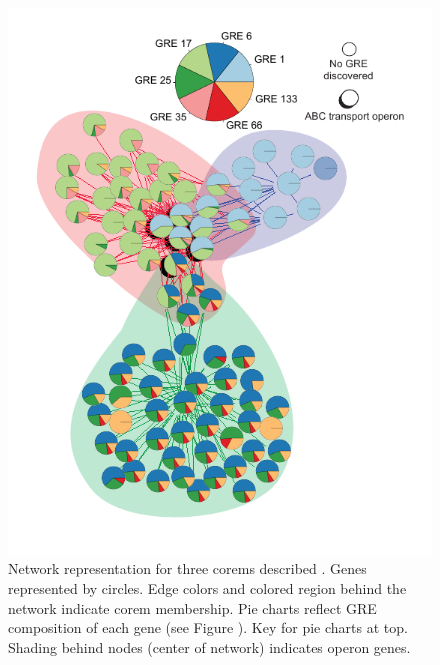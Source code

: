 \begin{figure}[hp]
\centering
\includegraphics[width=0.95\linewidth]{figures/dpp_networks.pdf}
\caption[Network representation of transcriptional isoforms for the \textit{dpp} operon predicted by corems]{\textbf{\textit{} } \DIFaddendFL Network representation for three corems described \DIFdelbeginFL {}\DIFdelendFL \DIFaddbeginFL {}\DIFaddendFL . Genes represented by circles. Edge colors and colored region behind the network indicate corem membership. Pie charts reflect GRE composition of each gene (see Figure \DIFdelbeginFL {}\DIFdelendFL \DIFaddbeginFL \DIFaddFL{\ref{fig:corem_gres}}\DIFaddendFL ). Key for pie charts at top. Shading behind nodes (center of network) indicates \DIFdelbeginFL {}\DIFdelendFL \DIFaddbeginFL \textit{} \DIFaddendFL operon genes.\DIFdelbeginFL %
\DIFdelendFL \DIFaddbeginFL }
\label{fig:dpp_networks}
\end{figure}

